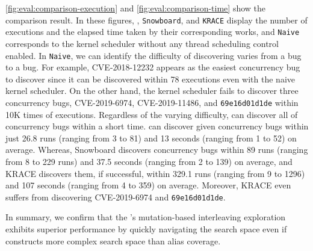 


%
\autoref{fig:eval:comparison-execution} and
\autoref{fig:eval:comparison-time} show the comparison result.
%
In these figures, \texttt{\sys}, \texttt{Snowboard}, and
\texttt{KRACE} display the number of executions and the elapsed time
taken by their corresponding works, and \texttt{Naive} corresponds to
the kernel scheduler without any thread scheduling control enabled.
%
%
In \texttt{Naive}, we can identify the difficulty of discovering
varies from a bug to a bug.
%
For example, CVE-2018-12232 appears as the easiest concurrency bug to
discover since it can be discovered within 78 executions even with the naive kernel scheduler.
%
On the other hand, the kernel scheduler fails to discover three
concurrency bugs, CVE-2019-6974, CVE-2019-11486, and
\texttt{69e16d01d1de} within 10K times of executions.
%
Regardless of the varying difficulty, \sys can discover all of
concurrency bugs within a short time.
%
\sys can discover given concurrency bugs within just 26.8 runs
(ranging from 3 to 81) and 13 seconds (ranging from 1 to 52) on
average.
%
Whereas, Snowboard discovers concurrency bugs within 89 runs (ranging
from 8 to 229 runs) and 37.5 seconds (ranging from 2 to 139) on
average, and KRACE discovers them, if successful, within 329.1 runs
(ranging from 9 to 1296) and 107 seconds (ranging from 4 to 359) on
average.  Moreover, KRACE even suffers from discovering CVE-2019-6974
and \texttt{69e16d01d1de}.

In summary, we confirm that the \sys's mutation-based interleaving
exploration exhibits superior performance by quickly navigating the
search space even if \intcov constructs more complex search space than
alias coverage.

